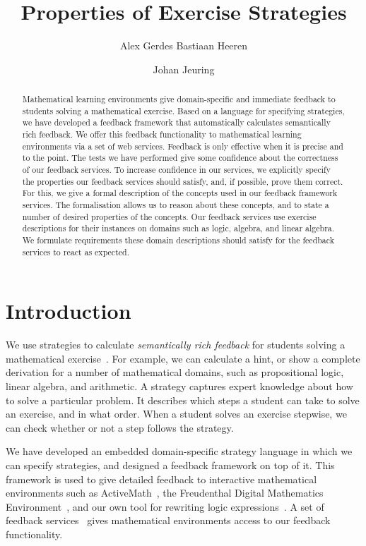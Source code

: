\documentclass[copyright]{eptcs}
\title{Properties of Exercise Strategies}
\author{
Alex Gerdes \qquad Bastiaan Heeren
\institute{School of Computer Science\\
Open Universiteit Nederland\\
Heerlen, The Netherlands}
\email{age@ou.nl \qquad \qquad bhr@ou.nl}
\and
Johan Jeuring
\institute{Department of Information and Computing Sciences\\
Utrecht Univeristy\\
Utrecht, The Netherlands}
\email{johanj@cs.uu.nl}
}
\begin{document}
\maketitle

\begin{abstract}
  Mathematical learning environments give domain-specific and immediate feedback
  to students solving a mathematical exercise. Based on a language for 
  specifying strategies, we have developed a feedback framework that 
  automatically calculates semantically rich feedback. We offer this feedback 
  functionality to mathematical learning environments via a set of web services.
Feedback is only effective when it is precise and to the point. The tests we
  have performed give some confidence about the correctness of our feedback
  services. To increase confidence in our services, we explicitly specify the
  properties our feedback services should satisfy, and, if possible, prove them
  correct. For this, we give a formal description of the concepts used in our
  feedback framework services. The formalisation allows us to reason about these
  concepts, and to state a number of desired properties of the concepts. Our 
  feedback services use exercise descriptions for their instances on domains such 
  as logic, algebra, and linear algebra. We formulate requirements these domain
  descriptions should satisfy for the feedback services to react as expected. 
\end{abstract}

\section{Introduction}
\label{sec:intro}
We use strategies to calculate \emph{semantically rich feedback} for students
solving a mathematical exercise~\cite{heeren-10}. For example, we can calculate
a hint, or show a complete derivation for a number of mathematical domains, such
as propositional logic, linear algebra, and arithmetic. A strategy captures
expert knowledge about how to solve a particular problem. It describes which
steps a student can take to solve an exercise, and in what order. When a student
solves an exercise stepwise, we can check whether or not a step follows the
strategy.

We have developed an embedded domain-specific strategy language in which we can
specify strategies, and designed a feedback framework on top of it. This
framework is used to give detailed feedback to interactive mathematical
environments such as ActiveMath~\cite{activemath}, the Freudenthal Digital
Mathematics Environment~\cite{dwo}, and our own tool for rewriting logic
expressions~\cite{lodder}. A set of feedback services~\cite{gerdes-08} gives
mathematical environments access to our feedback functionality.
\end{document}

